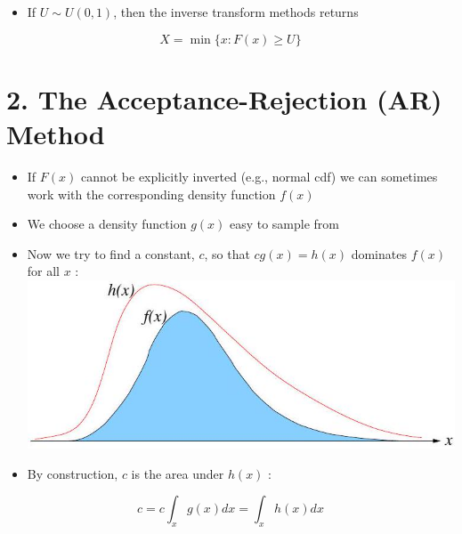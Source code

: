 \documentclass[10pt]{article}
\begin{document}
\begin{itemize}
  \item If $U \sim U(0,1)$, then the inverse transform methods returns
\end{itemize}

$$
X=\min \{x: F(x) \geq U\}
$$

\section*{2. The Acceptance-Rejection (AR) Method}
\begin{itemize}
  \item If $F(x)$ cannot be explicitly inverted (e.g., normal cdf) we can sometimes work with the corresponding density function $f(x)$
  \item We choose a density function $g(x)$ easy to sample from
  \item Now we try to find a constant, $c$, so that $c g(x)=h(x)$ dominates $f(x)$ for all $x$ :\\
\includegraphics[max width=\textwidth, center]{2025_05_12_520db7cd238ba7b44f0fg-38}
  \item By construction, $c$ is the area under $h(x)$ :
\end{itemize}

$$
c=c \int_{x} g(x) d x=\int_{x} h(x) d x
$$
\end{document}
